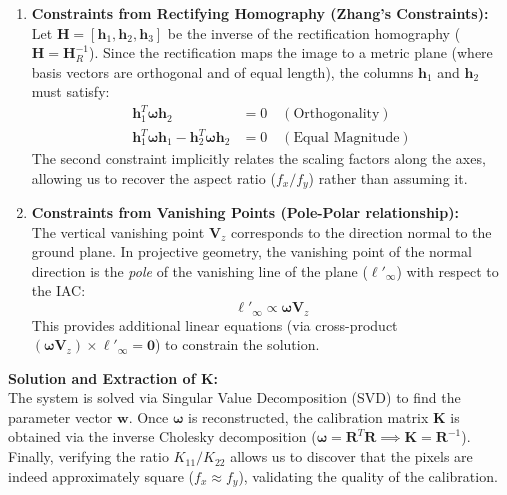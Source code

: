 \documentclass[a4paper,11pt]{article}
\newcommand{\matr}[1]{\bm{#1}}     %
\newcommand{\vect}[1]{\mathbf{#1}}  %
\begin{document}
\begin{enumerate}
    \item \textbf{Constraints from Rectifying Homography (Zhang's Constraints):} \\
    Let $\matr{H} = [\vect{h}_1, \vect{h}_2, \vect{h}_3]$ be the inverse of the rectification homography ($\matr{H} = \matr{H}_R^{-1}$). Since the rectification maps the image to a metric plane (where basis vectors are orthogonal and of equal length), the columns $\vect{h}_1$ and $\vect{h}_2$ must satisfy:
    \begin{align}
        \vect{h}_1^T \matr{\omega} \vect{h}_2 &= 0 \quad (\text{Orthogonality}) \\
        \vect{h}_1^T \matr{\omega} \vect{h}_1 - \vect{h}_2^T \matr{\omega} \vect{h}_2 &= 0 \quad (\text{Equal Magnitude})
    \end{align}
    The second constraint implicitly relates the scaling factors along the axes, allowing us to recover the aspect ratio ($f_x/f_y$) rather than assuming it.

    \item \textbf{Constraints from Vanishing Points (Pole-Polar relationship):} \\
    The vertical vanishing point $\vect{V}_z$ corresponds to the direction normal to the ground plane. In projective geometry, the vanishing point of the normal direction is the \textit{pole} of the vanishing line of the plane ($\vect{\ell}'_\infty$) with respect to the IAC:
    \begin{equation}
        \vect{\ell}'_\infty \propto \matr{\omega} \vect{V}_z
    \end{equation}
    This provides additional linear equations (via cross-product $(\matr{\omega} \vect{V}_z) \times \vect{\ell}'_\infty = \vect{0}$) to constrain the solution.
\end{enumerate}

\textbf{Solution and Extraction of K:} \\
The system is solved via Singular Value Decomposition (SVD) to find the parameter vector $\vect{w}$. Once $\matr{\omega}$ is reconstructed, the calibration matrix $\matr{K}$ is obtained via the inverse Cholesky decomposition ($\matr{\omega} = \matr{R}^T \matr{R} \implies \matr{K} = \matr{R}^{-1}$).
Finally, verifying the ratio $K_{11}/K_{22}$ allows us to discover that the pixels are indeed approximately square ($f_x \approx f_y$), validating the quality of the calibration.


\end{document}
